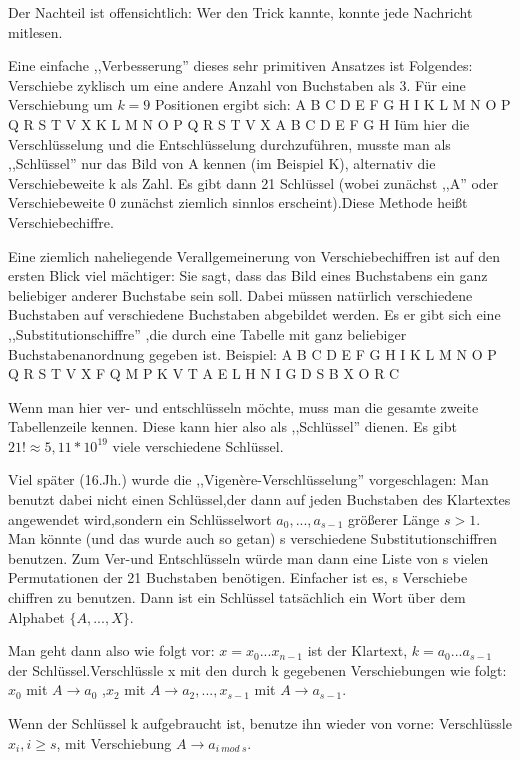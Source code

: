 \documentclass[a4paper]{article}
\begin{document}
\begin{multicols}{3}
    Der Nachteil ist offensichtlich: Wer den Trick kannte, konnte jede Nachricht mitlesen.

    Eine einfache ,,Verbesserung'' dieses sehr primitiven Ansatzes ist Folgendes: Verschiebe zyklisch um eine andere Anzahl von Buchstaben als 3. Für eine Verschiebung um $k=9$ Positionen ergibt sich:
    A B C D E F G H I K L M N O P Q R S T V X
    K L M N O P Q R S T V X A B C D E F G H Iüm hier die Verschlüsselung und die Entschlüsselung durchzuführen, musste man als ,,Schlüssel''  nur das Bild von A kennen (im Beispiel K), alternativ die Verschiebeweite k
    als Zahl. Es gibt dann 21 Schlüssel (wobei zunächst ,,A'' oder Verschiebeweite 0 zunächst ziemlich sinnlos erscheint).Diese Methode heißt Verschiebechiffre.

    Eine ziemlich naheliegende Verallgemeinerung von Verschiebechiffren ist auf den ersten Blick viel mächtiger: Sie sagt, dass das Bild eines Buchstabens ein ganz beliebiger anderer Buchstabe sein soll. Dabei müssen natürlich verschiedene Buchstaben auf verschiedene Buchstaben abgebildet werden. Es er gibt sich eine ,,Substitutionschiffre'' ,die durch eine Tabelle mit ganz beliebiger Buchstabenanordnung gegeben ist. Beispiel:
    A B C D E F G H I K L M N O P Q R S T V X
    F Q M P K V T A E L H N I G D S B X O R C

    Wenn man hier ver- und entschlüsseln möchte, muss man die gesamte zweite Tabellenzeile kennen. Diese kann hier also als ,,Schlüssel''  dienen. Es gibt $21!\approx 5,11* 10^{19}$ viele verschiedene Schlüssel.

    Viel später (16.Jh.) wurde die ,,Vigenère-Verschlüsselung'' vorgeschlagen: Man benutzt dabei nicht einen Schlüssel,der dann auf jeden Buchstaben des Klartextes angewendet wird,sondern ein Schlüsselwort $a_0,...,a_{s-1}$ größerer Länge $s > 1$. Man könnte (und das wurde auch so getan) s verschiedene Substitutionschiffren benutzen. Zum Ver-und Entschlüsseln
    würde man dann eine Liste von s vielen Permutationen der 21 Buchstaben benötigen. Einfacher ist es, s Verschiebe chiffren zu benutzen. Dann ist ein Schlüssel tatsächlich ein Wort über dem Alphabet $\{A,...,X\}$.

    Man geht dann also wie folgt vor: $x=x_0...x_{n-1}$ ist der Klartext, $k=a_0 ...a_{s-1}$ der Schlüssel.Verschlüssle x mit den durch k gegebenen Verschiebungen wie folgt:
    $x_0$ mit $A \rightarrow a_0$ ,$x_2$ mit $A \rightarrow a_2,... ,x_{s-1}$ mit $A\rightarrow a_{s-1}$.

    Wenn der Schlüssel k aufgebraucht ist, benutze ihn wieder von vorne: Verschlüssle $x_i,i\geq s$, mit Verschiebung $A \rightarrow a_{i\ mod\ s}$.


\end{multicols}
\end{document}
